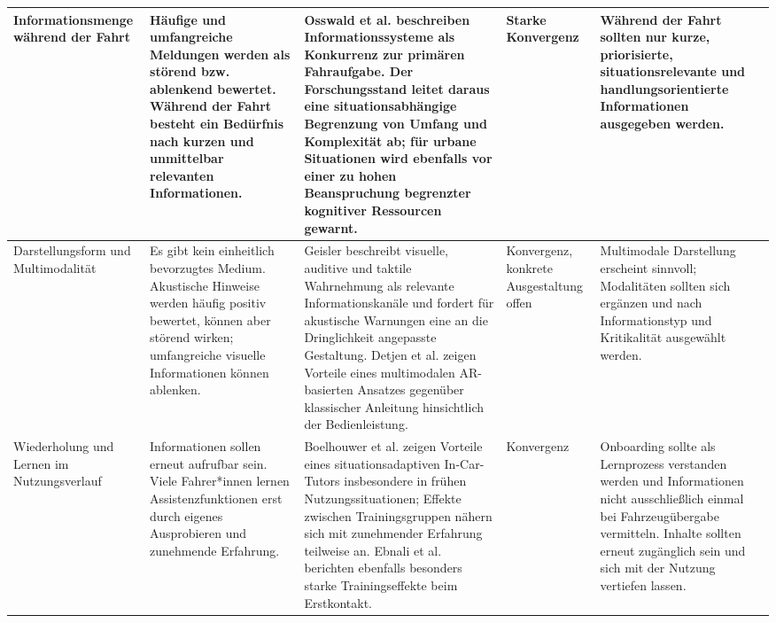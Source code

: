 {\begin{xltabular}{\textwidth}{
    |P{2.4cm}
    |P{2.8cm}
    |Y
    |P{1.8cm}
    |P{2.6cm}|
}
Informationsmenge während der Fahrt &
Häufige und umfangreiche Meldungen werden als störend bzw. ablenkend bewertet.
Während der Fahrt besteht ein Bedürfnis nach kurzen und unmittelbar relevanten
Informationen. &
Osswald et al. \cite{osswald2012predicting} beschreiben Informationssysteme als Konkurrenz zur
primären Fahraufgabe. Der Forschungsstand leitet daraus eine
situationsabhängige Begrenzung von Umfang und Komplexität ab; für urbane
Situationen wird ebenfalls vor einer zu hohen Beanspruchung begrenzter
kognitiver Ressourcen gewarnt. &
Starke Konvergenz &
Während der Fahrt sollten nur kurze, priorisierte, situationsrelevante und
handlungsorientierte Informationen ausgegeben werden.
\\
\hline

Darstellungsform und Multimodalität &
Es gibt kein einheitlich bevorzugtes Medium. Akustische Hinweise werden häufig
positiv bewertet, können aber störend wirken; umfangreiche visuelle
Informationen können ablenken. &
Geisler \cite{Geisler_hci2021} beschreibt visuelle, auditive und taktile Wahrnehmung als
relevante Informationskanäle und fordert für akustische Warnungen eine an die
Dringlichkeit angepasste Gestaltung. Detjen et al. \cite{detjen2021supporting} zeigen Vorteile
eines multimodalen AR-basierten Ansatzes gegenüber klassischer Anleitung
hinsichtlich der Bedienleistung. &
Konvergenz, konkrete Ausgestaltung offen &
Multimodale Darstellung erscheint sinnvoll; Modalitäten sollten sich ergänzen
und nach Informationstyp und Kritikalität ausgewählt werden.
\\
\hline

Wiederholung und Lernen im Nutzungsverlauf &
Informationen sollen erneut aufrufbar sein. Viele Fahrer*innen lernen
Assistenzfunktionen erst durch eigenes Ausprobieren und zunehmende Erfahrung. &
Boelhouwer et al. \cite{Boelhouwer2020} zeigen Vorteile eines situationsadaptiven In-Car-Tutors
insbesondere in frühen Nutzungssituationen; Effekte zwischen Trainingsgruppen
nähern sich mit zunehmender Erfahrung teilweise an. Ebnali et al. \cite{ebnali2020familiarization}
berichten ebenfalls besonders starke Trainingseffekte beim Erstkontakt. &
Konvergenz &
Onboarding sollte als Lernprozess verstanden werden und Informationen nicht
ausschließlich einmal bei Fahrzeugübergabe vermitteln. Inhalte sollten erneut
zugänglich sein und sich mit der Nutzung vertiefen lassen.
\\
\hline


\end{xltabular}}
